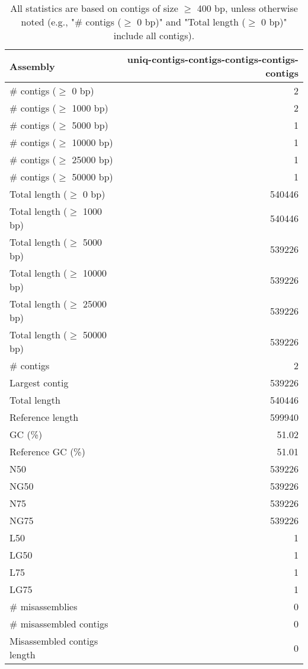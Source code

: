 \documentclass[12pt,a4paper]{article}
\begin{document}
\begin{table}[ht]
\begin{center}
\caption{All statistics are based on contigs of size $\geq$ 400 bp, unless otherwise noted (e.g., "\# contigs ($\geq$ 0 bp)" and "Total length ($\geq$ 0 bp)" include all contigs).}
\begin{tabular}{|l*{1}{|r}|}
\hline
Assembly & uniq-contigs-contigs-contigs-contigs-contigs \\ \hline
\# contigs ($\geq$ 0 bp) & 2 \\ \hline
\# contigs ($\geq$ 1000 bp) & 2 \\ \hline
\# contigs ($\geq$ 5000 bp) & 1 \\ \hline
\# contigs ($\geq$ 10000 bp) & 1 \\ \hline
\# contigs ($\geq$ 25000 bp) & 1 \\ \hline
\# contigs ($\geq$ 50000 bp) & 1 \\ \hline
Total length ($\geq$ 0 bp) & 540446 \\ \hline
Total length ($\geq$ 1000 bp) & 540446 \\ \hline
Total length ($\geq$ 5000 bp) & 539226 \\ \hline
Total length ($\geq$ 10000 bp) & 539226 \\ \hline
Total length ($\geq$ 25000 bp) & 539226 \\ \hline
Total length ($\geq$ 50000 bp) & 539226 \\ \hline
\# contigs & 2 \\ \hline
Largest contig & 539226 \\ \hline
Total length & 540446 \\ \hline
Reference length & 599940 \\ \hline
GC (\%) & 51.02 \\ \hline
Reference GC (\%) & 51.01 \\ \hline
N50 & 539226 \\ \hline
NG50 & 539226 \\ \hline
N75 & 539226 \\ \hline
NG75 & 539226 \\ \hline
L50 & 1 \\ \hline
LG50 & 1 \\ \hline
L75 & 1 \\ \hline
LG75 & 1 \\ \hline
\# misassemblies & 0 \\ \hline
\# misassembled contigs & 0 \\ \hline
Misassembled contigs length & 0 \\ \hline

\end{tabular}
\end{center}
\end{table}
\end{document}
